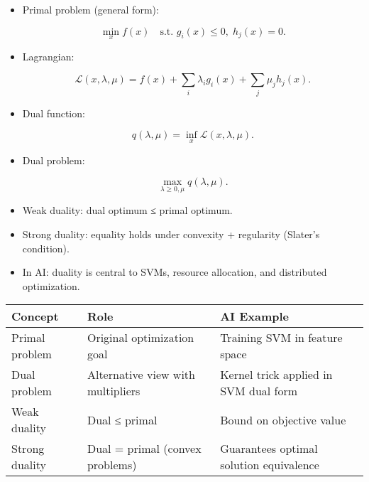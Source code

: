 \documentclass[
  letterpaper,
  DIV=11,
  numbers=noendperiod]{scrreprt}
\begin{document}
\begin{itemize}
\item
  Primal problem (general form):

  \[
  \min_x f(x) \quad \text{s.t. } g_i(x) \leq 0, \; h_j(x)=0.
  \]
\item
  Lagrangian:

  \[
  \mathcal{L}(x,λ,μ) = f(x) + \sum_i λ_i g_i(x) + \sum_j μ_j h_j(x).
  \]
\item
  Dual function:

  \[
  q(λ,μ) = \inf_x \mathcal{L}(x,λ,μ).
  \]
\item
  Dual problem:

  \[
  \max_{λ \geq 0, μ} q(λ,μ).
  \]
\item
  Weak duality: dual optimum ≤ primal optimum.
\item
  Strong duality: equality holds under convexity + regularity (Slater's
  condition).
\item
  In AI: duality is central to SVMs, resource allocation, and
  distributed optimization.
\end{itemize}

\begin{longtable}[]{@{}
  >{\raggedright\arraybackslash}p{}
  >{\raggedright\arraybackslash}p{}
  >{\raggedright\arraybackslash}p{}@{}}
\toprule\noalign{}
\begin{minipage}[b]{\linewidth}\raggedright
Concept
\end{minipage} & \begin{minipage}[b]{\linewidth}\raggedright
Role
\end{minipage} & \begin{minipage}[b]{\linewidth}\raggedright
AI Example
\end{minipage} \\
\midrule\noalign{}
\endhead
\bottomrule\noalign{}
\endlastfoot
Primal problem & Original optimization goal & Training SVM in feature
space \\
Dual problem & Alternative view with multipliers & Kernel trick applied
in SVM dual form \\
Weak duality & Dual ≤ primal & Bound on objective value \\
Strong duality & Dual = primal (convex problems) & Guarantees optimal
solution equivalence \\
\end{longtable}
\end{document}
